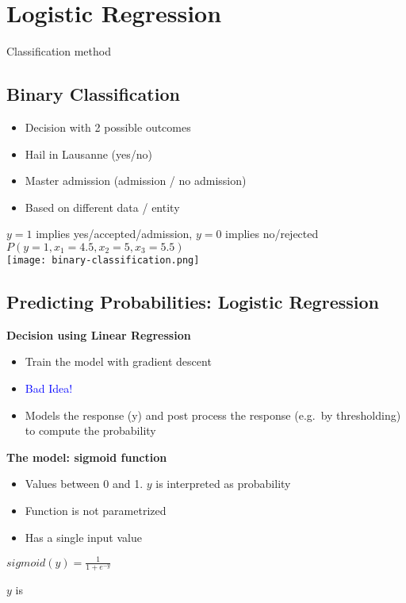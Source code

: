 \section{Logistic Regression}
Classification method

\subsection{Binary Classification}
\begin{itemize}
    \item Decision with 2 possible outcomes
    \item Hail in Lausanne (yes/no)
    \item Master admission (admission / no admission)
    \item Based on different data / entity
\end{itemize}
$y = 1$ implies yes/accepted/admission, $y = 0$ implies no/rejected \\
$P(y = 1, x_1 = 4.5, x_2 = 5, x_3 = 5.5)$\\

\texttt{[image: binary-classification.png]}

\subsection{Predicting Probabilities: Logistic Regression}

\textbf{Decision using Linear Regression}
\begin{itemize}
    \item Train the model with gradient descent
    \item \textcolor{blue}{Bad Idea!}
    \item Models the response (y) and post process the response (e.g.\ by thresholding) to compute the probability
\end{itemize}

\textbf{The model: sigmoid function} \\

\begin{itemize}
    \item Values between 0 and 1. $y$ is interpreted as probability
    \item Function is not parametrized
    \item Has a single input value
\end{itemize}

\begin{center}
    $sigmoid(y) = \frac{1}{1 + e^{-y}}$
\end{center}
$y$ is

